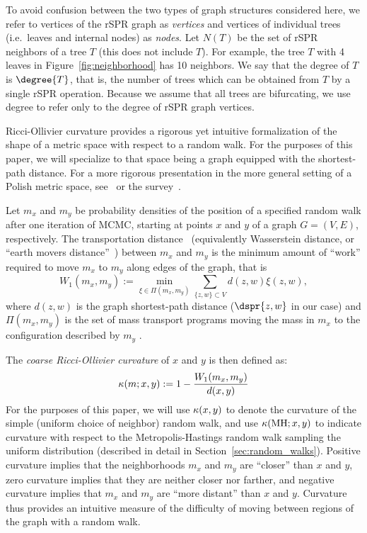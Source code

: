 \documentclass[11pt,onecolumn,conference]{IEEEtran}
\newcommand{\MH}{\operatorname{MH}}
\newcommand{\cuttable}[2][]{%
    \ifthenelse{\equal{#1}{}}%
		{}%
		{#1}%
}
\newcommand{\curvature}[2][]{%
    \ifthenelse{\equal{#1}{}}%
		{\kappa(#2)}%
		{\kappa_{#1}(#2)}%
}
\begin{document}
To avoid confusion between the two types of graph structures considered here, we refer to vertices of the rSPR graph as \emph{vertices} and vertices of individual trees (i.e.\ leaves and internal nodes) as \emph{nodes}.
Let $N(T)$ be the set of rSPR neighbors of a tree $T$ (this does not include $T$).
For example, the tree $T$ with 4 leaves in Figure~\ref{fig:neighborhood} has 10 neighbors.
We say that the degree of $T$ is $\degree{T}$, that is, the number of trees which can be obtained from $T$ by a single rSPR operation.
Because we assume that all trees are bifurcating, we use degree to refer only to the degree of rSPR graph vertices.

Ricci-Ollivier curvature provides a rigorous yet intuitive formalization of the shape of a metric space with respect to a random walk.
For the purposes of this paper, we will specialize to that space being a graph equipped with the shortest-path distance.
For a more rigorous presentation in the more general setting of a Polish metric space, see~\cite{Ollivier2009-bw} or the survey~\cite{Ollivier2010-ao}.

Let $m_x$ and $m_y$ be probability densities of the position of a specified random walk after one iteration of MCMC, starting at points $x$ and $y$ of a graph $G = (V,E)$, respectively.
The transportation distance~\cite{Villani2003-wv} (equivalently Wasserstein distance, or ``earth movers distance''~\cite{rubner2000earth}) between $m_x$ and $m_y$ is the minimum amount of ``work'' required to move $m_x$ to $m_y$ along edges of the graph, that is
$$ W_1(m_x, m_y) := \min_{\xi \in \Pi(m_x, m_y)} \sum_{\{z,w\} \subset V} d(z,w) \xi(z,w),$$
where $d(z,w)$ is the graph shortest-path distance ($\dspr{z,w}$ in our case) and $\Pi(m_x, m_y)$ is the set of mass transport programs moving the mass in $m_x$ to the configuration described by $m_y$\cuttable{ (more formally, a density on $V \times V$ which is $m_x$ after projecting on the first component and $m_y$ after projecting on the second)}.

The \emph{coarse Ricci-Ollivier curvature} of $x$ and $y$ is then defined as:
\begin{equation}
\curvature{m; x, y} := 1 - \frac{W_1(m_x, m_y)}{d(x, y)}
\label{eq:curvatureDef}
\end{equation}
For the purposes of this paper, we will use $\curvature{x,y}$ to denote the curvature of the simple (uniform choice of neighbor) random walk, and use $\curvature{\MH; x,y}$ to indicate curvature with respect to the Metropolis-Hastings random walk sampling the uniform distribution (described in detail in Section~\ref{sec:random_walks}).
Positive curvature implies that the neighborhoods $m_x$ and $m_y$ are ``closer'' than $x$ and $y$, zero curvature implies that they are neither closer nor farther, and negative curvature implies that $m_x$ and $m_y$ are \cuttable{on average }``more distant'' than $x$ and $y$.
Curvature thus provides an intuitive measure of the difficulty of moving between regions of the graph with \cuttable[a]{the given} random walk.
\end{document}
